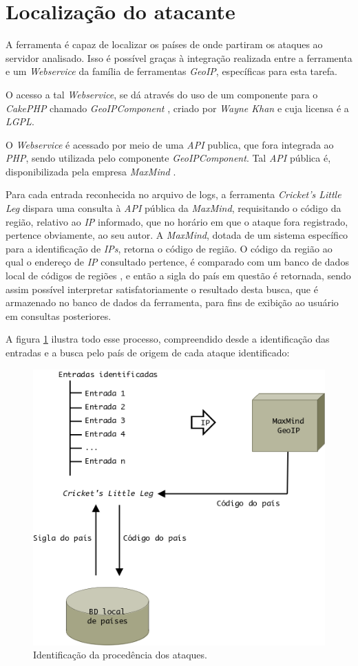 \section{Localização do atacante}

A ferramenta é capaz de localizar os países de onde partiram os ataques ao servidor analisado. Isso é possível graças à integração realizada entre a ferramenta e um \textit{Webservice} da família de ferramentas \textit{GeoIP}, específicas para esta tarefa.

O acesso a tal \textit{Webservice}, se dá através do uso de um componente para o \textit{CakePHP} chamado \textit{GeoIPComponent} \cite{GeoIPComponent}, criado por \textit{Wayne Khan} e cuja licensa é a \textit{LGPL}.

O \textit{Webservice} é acessado por meio de uma \textit{API} publica, que fora integrada ao \textit{PHP}, sendo utilizada pelo componente \textit{GeoIPComponent}. Tal \textit{API} pública é, disponibilizada pela empresa \textit{MaxMind} \cite{MaxMind}.

Para cada entrada reconhecida no arquivo de logs, a ferramenta \textit{Cricket's Little Leg} dispara uma consulta à \textit{API} pública da \textit{MaxMind}, requisitando o código da região, relativo ao \textit{IP} informado, que no horário em que o ataque fora registrado, pertence obviamente, ao seu autor. A \textit{MaxMind}, dotada de um sistema específico para a identificação de \textit{IPs}, retorna o código de região. O código da região ao qual o endereço de \textit{IP} consultado pertence, é comparado com um banco de dados local de códigos de regiões \cite{BDRegioes}, e então a sigla do país em questão é retornada, sendo assim possível interpretar satisfatoriamente o resultado desta busca, que é armazenado no banco de dados da ferramenta, para fins de exibição ao usuário em consultas posteriores.

A figura \ref{figura:ws-geoip} ilustra todo esse processo, compreendido desde a identificação das entradas e a busca pelo país de origem de cada ataque identificado:

\begin{figure}[h]
    \begin{center}
        \includegraphics[scale=0.5]{./figuras/ws-geoip.png}

        \caption{\label{figura:ws-geoip}Identificação da procedência dos ataques.}
    \end{center}
\end{figure}
